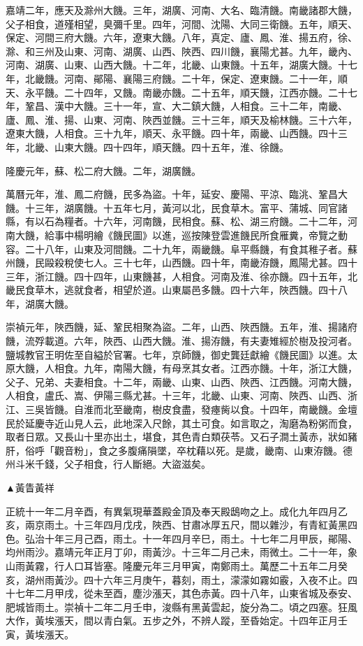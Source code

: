 \begin{pinyinscope}
嘉靖二年，應天及滁州大饑。三年，湖廣、河南、大名、臨清饑。南畿諸郡大饑，父子相食，道殣相望，臭彌千里。四年，河間、沈陽、大同三衛饑。五年，順天、保定、河間三府大饑。六年，遼東大饑。八年，真定、廬、鳳、淮、揚五府，徐、滁、和三州及山東、河南、湖廣、山西、陜西、四川饑，襄陽尤甚。九年，畿內、河南、湖廣、山東、山西大饑。十二年，北畿、山東饑。十五年，湖廣大饑。十七年，北畿饑。河南、鄖陽、襄陽三府饑。二十年，保定、遼東饑。二十一年，順天、永平饑。二十四年，又饑。南畿亦饑。二十五年，順天饑，江西亦饑。二十七年，鞏昌、漢中大饑。三十一年，宣、大二鎮大饑，人相食。三十二年，南畿、廬、鳳、淮、揚、山東、河南、陜西並饑。三十三年，順天及榆林饑。三十六年，遼東大饑，人相食。三十九年，順天、永平饑。四十年，兩畿、山西饑。四十三年，北畿、山東大饑。四十四年，順天饑。四十五年，淮、徐饑。

隆慶元年，蘇、松二府大饑。二年，湖廣饑。

萬曆元年，淮、鳳二府饑，民多為盜。十年，延安、慶陽、平涼、臨洮、鞏昌大饑。十三年，湖廣饑。十五年七月，黃河以北，民食草木。富平、蒲城、同官諸縣，有以石為糧者。十六年，河南饑，民相食。蘇、松、湖三府饑。二十二年，河南大饑，給事中楊明繪《饑民圖》以進，巡按陳登雲進饑民所食雁糞，帝覽之動容。二十八年，山東及河間饑。二十九年，兩畿饑。阜平縣饑，有食其稚子者。蘇州饑，民毆殺稅使七人。三十七年，山西饑。四十年，南畿洊饑，鳳陽尤甚。四十三年，浙江饑。四十四年，山東饑甚，人相食。河南及淮、徐亦饑。四十五年，北畿民食草木，逃就食者，相望於道。山東屬邑多饑。四十六年，陜西饑。四十八年，湖廣大饑。

崇禎元年，陜西饑，延、鞏民相聚為盜。二年，山西、陜西饑。五年，淮、揚諸府饑，流殍載道。六年，陜西、山西大饑。淮、揚洊饑，有夫妻雉經於樹及投河者。鹽城教官王明佐至自縊於官署。七年，京師饑，御史龔廷獻繪《饑民圖》以進。太原大饑，人相食。九年，南陽大饑，有母烹其女者。江西亦饑。十年，浙江大饑，父子、兄弟、夫妻相食。十二年，兩畿、山東、山西、陜西、江西饑。河南大饑，人相食，盧氏、嵩、伊陽三縣尤甚。十三年，北畿、山東、河南、陜西、山西、浙江、三吳皆饑。自淮而北至畿南，樹皮食盡，發瘞胔以食。十四年，南畿饑。金壇民於延慶寺近山見人云，此地深入尺餘，其土可食。如言取之，淘磨為粉粥而食，取者日眾。又長山十里亦出土，堪食，其色青白類茯苓。又石子澗土黃赤，狀如豬肝，俗呼「觀音粉」，食之多腹痛隕墜，卒枕藉以死。是歲，畿南、山東洊饑。德州斗米千錢，父子相食，行人斷絕。大盜滋矣。

▲黃眚黃祥

正統十一年二月辛酉，有異氣現華蓋殿金頂及奉天殿鴟吻之上。成化九年四月乙亥，兩京雨土。十三年四月戊戌，陜西、甘肅冰厚五尺，間以雜沙，有青紅黃黑四色。弘治十年三月己酉，雨土。十一年四月辛巳，雨土。十七年二月甲辰，鄖陽、均州雨沙。嘉靖元年正月丁卯，雨黃沙。十三年二月己未，雨微土。二十一年，象山雨黃霧，行人口耳皆塞。隆慶元年三月甲寅，南鄭雨土。萬歷二十五年二月癸亥，湖州雨黃沙。四十六年三月庚午，暮刻，雨土，濛濛如霧如霰，入夜不止。四十七年二月甲戌，從未至酉，塵沙漲天，其色赤黃。四十八年，山東省城及泰安、肥城皆雨土。崇禎十二年二月壬申，浚縣有黑黃雲起，旋分為二。頃之四塞。狂風大作，黃埃漲天，間以青白氣。五步之外，不辨人蹤，至昏始定。十四年正月壬寅，黃埃漲天。



\end{pinyinscope}